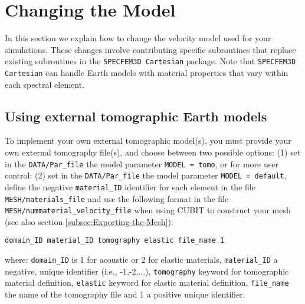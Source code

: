 \chapter{Changing the Model}\label{cha:-Changing-the}

In this section we explain how to change the velocity model used for
your simulations. These changes involve contributing specific subroutines
that replace existing subroutines in the \texttt{SPECFEM3D Cartesian}
package. Note that \texttt{SPECFEM3D Cartesian} can handle Earth models
with material properties that vary within each spectral element.


\section{Using external tomographic Earth models}\label{sec:Using-tomographic}

To implement your own external tomographic model(s), you must provide
your own external tomography file(s), and choose between two possible
options:\newline
 \indent (1) set in the \texttt{DATA/Par\_file} the model parameter \texttt{MODEL
= tomo}, \newline
 or for more user control: \newline
 \indent (2) set in the \texttt{DATA/Par\_file} the model parameter \texttt{MODEL
= default}, define the negative \texttt{material\_ID} identifier for
each element in the file \texttt{MESH/materials\_file} and use the
following format in the file \texttt{MESH/nummaterial\_velocity\_file}
when using CUBIT to construct your mesh (see also section \ref{subsec:Exporting-the-Mesh}):
\begin{verbatim}
domain_ID material_ID tomography elastic file_name 1
\end{verbatim}
where: \newline
 \indent \texttt{domain\_ID} is 1 for acoustic or 2 for elastic materials,
\newline
 \indent \texttt{material\_ID} a negative, unique identifier (i.e.,
-1,-2,...), \newline
 \indent \texttt{tomography} keyword for tomographic material definition,
\newline
 \indent \texttt{elastic} keyword for elastic material definition,
\newline
 \indent \texttt{file\_name} the name of the tomography file and
1 a positive unique identifier.\newline


